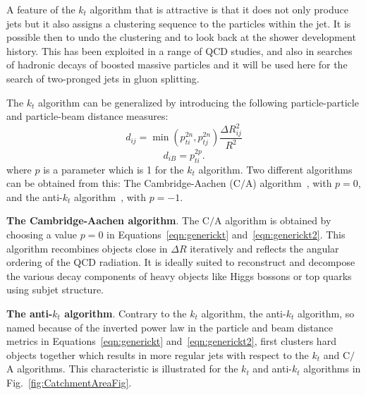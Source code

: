 A feature of the $k_t$ algorithm that is attractive is that it does not only produce jets but it also assigns a clustering sequence to the particles within the jet. It is possible then to undo the clustering and to look %
back at the shower development history.  This has been exploited in a range of QCD studies, and also in searches of hadronic decays of boosted massive particles  and it will be used here for the search of two-pronged jets in gluon splitting.

The $k_t$ algorithm can be generalized by introducing the following particle-particle and particle-beam distance measures:
%
\begin{equation} 
d_{ij} = \min(p^{2n}_{ti},p^{2n}_{tj}) \frac{\Delta R^2_{ij}}{R^2}
 \label{eqn:generickt}
\end{equation}
%
\begin{equation}
d_{iB}=p^{2p}_{ti}. 
 \label{eqn:generickt2}
\end{equation}
%
where $p$ is a parameter which is 1 for the $k_t$ algorithm. Two different algorithms can be obtained from this: The Cambridge-Aachen (C$/$A) algorithm~\cite{CamAchem}, with $p=0$, and the anti-$k_t$ algorithm~\cite{antiktalg}, with $p=-1$. 

\textbf{The Cambridge-Aachen algorithm}. The C$/$A algorithm is obtained by choosing a value $p=0$ in Equations~\ref{eqn:generickt} and~\ref{eqn:generickt2}. This algorithm recombines objects close in $\Delta R$ iteratively and reflects the angular ordering of the QCD radiation.  It is ideally suited to reconstruct and decompose the various decay components of heavy objects like Higgs bossons or top quarks using subjet structure.


\textbf{The anti-$k_t$ algorithm}. Contrary to the $k_t$ algorithm, the anti-$k_t$ algorithm, so named because of the inverted power law in the particle and beam distance metrics in Equations~\ref{eqn:generickt} and~\ref{eqn:generickt2}, first clusters hard objects together %
which results in more regular jets with respect to the $k_t$ and C$/$A algorithms. This characteristic is illustrated for the $k_t$ and anti-$k_t$ algorithms in Fig.~\ref{fig:CatchmentAreaFig}.

